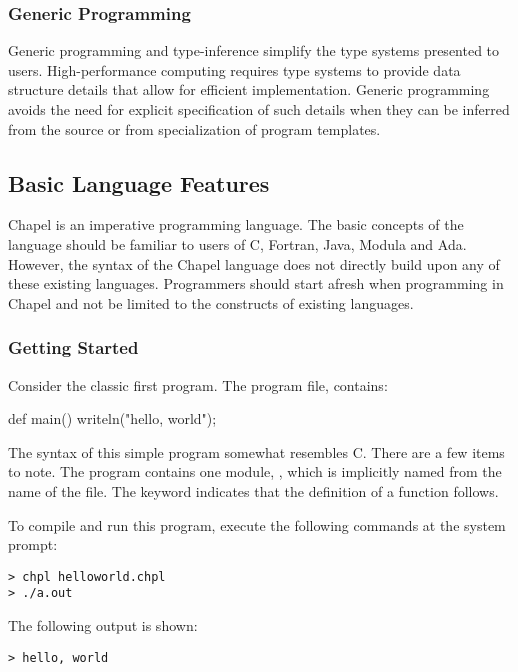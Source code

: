 \subsubsection{Generic Programming}
\label{Generic_Programming}

Generic programming and type-inference simplify the
type systems presented to users. High-performance computing
requires type systems to provide data structure details
that allow for efficient implementation. Generic programming
avoids the need for explicit specification of such
details when they can be inferred from the source or from
specialization of program templates.

\subsection{Basic Language Features}
\label{Basic_Language_Features}

Chapel is an imperative programming language.  The basic concepts of the
language should be familiar to users of C, Fortran, Java, Modula and Ada.
However, the syntax of the Chapel language does not directly build upon any of 
these existing languages.   Programmers should start afresh when programming in 
Chapel and not be limited to the constructs of existing languages.

\subsubsection{Getting Started}

Consider the classic first program.  The program file,
 contains:
\begin{chapel}
def main() {
  writeln("hello, world");
}
\end{chapel}

The syntax of this simple program somewhat resembles C.  There are a
few items to note.
The program contains one module, , which is implicitly
named from the name of the file.  The keyword  indicates that the
definition of a function follows.

To compile and run this program, execute the following
commands at the system prompt:
\begin{verbatim}
> chpl helloworld.chpl
> ./a.out
\end{verbatim}
The following output is shown:
\begin{verbatim}
> hello, world
\end{verbatim}

